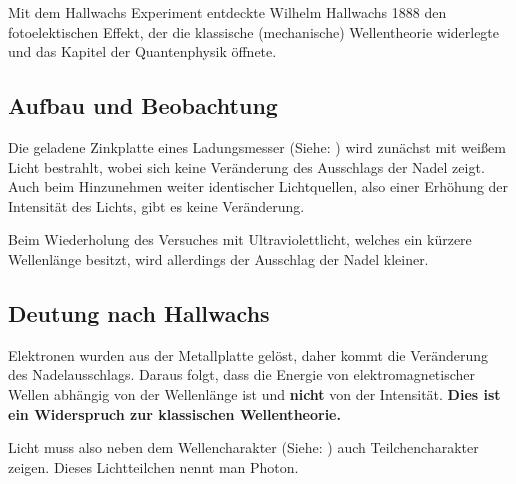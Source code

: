 Mit dem Hallwachs Experiment entdeckte Wilhelm Hallwachs 1888 den fotoelektischen Effekt, der die klassische (mechanische) Wellentheorie widerlegte und das Kapitel der Quantenphysik öffnete.

\subsection{Aufbau und Beobachtung}

Die geladene Zinkplatte eines Ladungsmesser (Siehe: ) wird zunächst mit weißem Licht bestrahlt, wobei sich keine Veränderung des Ausschlags der Nadel zeigt. Auch beim Hinzunehmen weiter identischer Lichtquellen, also einer Erhöhung der Intensität des Lichts, gibt es keine Veränderung.

Beim Wiederholung des Versuches mit Ultraviolettlicht, welches ein kürzere Wellenlänge besitzt, wird allerdings der Ausschlag der Nadel kleiner.

\subsection{Deutung nach Hallwachs}

Elektronen wurden aus der Metallplatte gelöst, daher kommt die Veränderung des Nadelausschlags. Daraus folgt, dass die Energie von elektromagnetischer Wellen abhängig von der Wellenlänge ist und \textbf{nicht} von der Intensität. \textbf{Dies ist ein Widerspruch zur klassischen Wellentheorie.}

Licht muss also neben dem Wellencharakter (Siehe: ) auch Teilchencharakter zeigen. Dieses Lichtteilchen nennt man \glqq Photon\grqq .